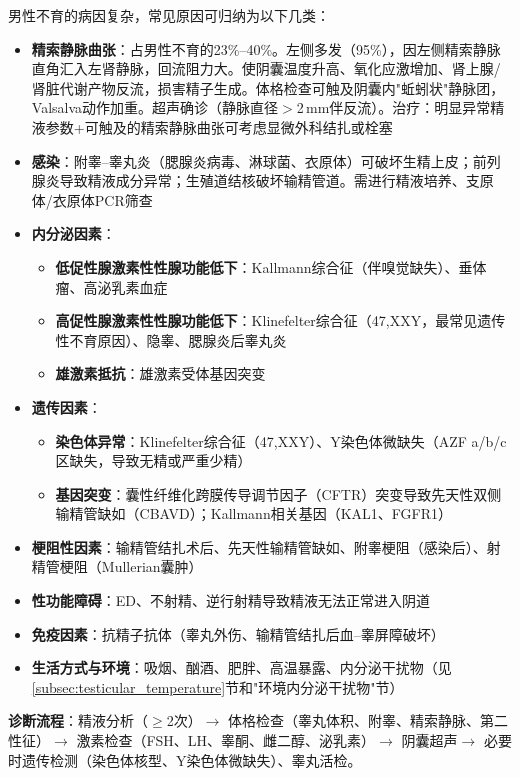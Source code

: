 男性不育的病因复杂，常见原因可归纳为以下几类：

\begin{itemize}[leftmargin=2cm]
	\item \textbf{精索静脉曲张}：占男性不育的23\%--40\%。左侧多发（95\%），因左侧精索静脉直角汇入左肾静脉，回流阻力大。使阴囊温度升高、氧化应激增加、肾上腺/肾脏代谢产物反流，损害精子生成。体格检查可触及阴囊内"蚯蚓状"静脉团，Valsalva动作加重。超声确诊（静脉直径$>$2\,mm伴反流）。治疗：明显异常精液参数+可触及的精索静脉曲张可考虑显微外科结扎或栓塞
	\item \textbf{感染}：附睾--睾丸炎（腮腺炎病毒、淋球菌、衣原体）可破坏生精上皮；前列腺炎导致精液成分异常；生殖道结核破坏输精管道。需进行精液培养、支原体/衣原体PCR筛查
	\item \textbf{内分泌因素}：
    \begin{itemize}
    	\item \textbf{低促性腺激素性性腺功能低下}：Kallmann综合征（伴嗅觉缺失）、垂体瘤、高泌乳素血症
    	\item \textbf{高促性腺激素性性腺功能低下}：Klinefelter综合征（47,XXY，最常见遗传性不育原因）、隐睾、腮腺炎后睾丸炎
    	\item \textbf{雄激素抵抗}：雄激素受体基因突变
    \end{itemize}
	\item \textbf{遗传因素}：
    \begin{itemize}
    	\item \textbf{染色体异常}：Klinefelter综合征（47,XXY）、Y染色体微缺失（AZF a/b/c区缺失，导致无精或严重少精）
    	\item \textbf{基因突变}：囊性纤维化跨膜传导调节因子（CFTR）突变导致先天性双侧输精管缺如（CBAVD）；Kallmann相关基因（KAL1、FGFR1）
    \end{itemize}
	\item \textbf{梗阻性因素}：输精管结扎术后、先天性输精管缺如、附睾梗阻（感染后）、射精管梗阻（Mullerian囊肿）
	\item \textbf{性功能障碍}：ED、不射精、逆行射精导致精液无法正常进入阴道
	\item \textbf{免疫因素}：抗精子抗体（睾丸外伤、输精管结扎后血--睾屏障破坏）
	\item \textbf{生活方式与环境}：吸烟、酗酒、肥胖、高温暴露、内分泌干扰物（见\ref{subsec:testicular_temperature}节和"环境内分泌干扰物"节）
\end{itemize}

\textbf{诊断流程}：精液分析（$\ge$2次）$\rightarrow$ 体格检查（睾丸体积、附睾、精索静脉、第二性征）$\rightarrow$ 激素检查（FSH、LH、睾酮、雌二醇、泌乳素）$\rightarrow$ 阴囊超声$\rightarrow$ 必要时遗传检测（染色体核型、Y染色体微缺失）、睾丸活检。

